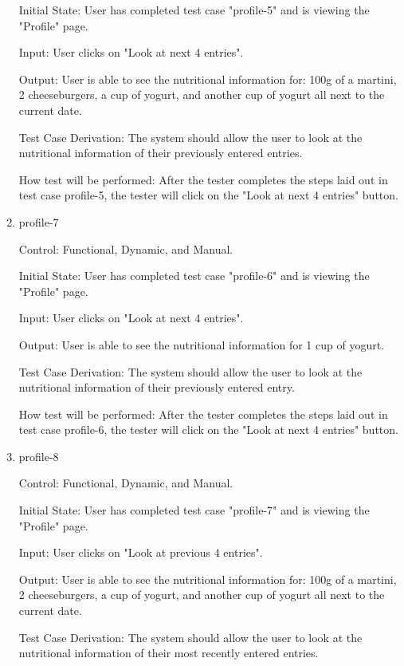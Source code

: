 \documentclass[12pt, titlepage]{article}
\begin{document}
\begin{enumerate}
		Initial State: User has completed test case "profile-5" and is viewing the "Profile" page.
		
		Input: User clicks on "Look at next 4 entries".
		
		Output: User is able to see the nutritional information for: 100g of a martini, 2 cheeseburgers, a cup of yogurt, and another cup of yogurt all next to the current date.
		
		Test Case Derivation: The system should allow the user to look at the nutritional information of their previously entered entries.
		
		How test will be performed: After the tester completes the steps laid out in test case profile-5, the tester will click on the "Look at next 4 entries" button.
		
		\item{profile-7\\}
		
		Control: Functional, Dynamic, and Manual.
		
		Initial State: User has completed test case "profile-6" and is viewing the "Profile" page.
		
		Input: User clicks on "Look at next 4 entries".
		
		Output: User is able to see the nutritional information for 1 cup of yogurt.
		
		Test Case Derivation: The system should allow the user to look at the nutritional information of their previously entered entry.
		
		How test will be performed: After the tester completes the steps laid out in test case profile-6, the tester will click on the "Look at next 4 entries" button.
		
		\item{profile-8\\}
		
		Control: Functional, Dynamic, and Manual.
		
		Initial State: User has completed test case "profile-7" and is viewing the "Profile" page.
		
		Input: User clicks on "Look at previous 4 entries".
		
		Output: User is able to see the nutritional information for: 100g of a martini, 2 cheeseburgers, a cup of yogurt, and another cup of yogurt all next to the current date.
		
		Test Case Derivation: The system should allow the user to look at the nutritional information of their most recently entered entries.
		

\end{enumerate}
\end{document}
